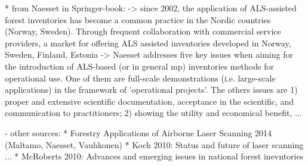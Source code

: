 			* from Naesset in Springer-book: 
			  -> since 2002, the application of ALS-assisted forest inventories has become a common practice in the Nordic countries (Norway, Sweden). Through frequent collaboration with commercial service 
			     providers, a market for offering ALS assisted inventories developed in Norway, Sweden, Finland, Estonia
			  -> Naesset addresses five key issues when aiming for the introduction of ALS-based (or in general mp) inventories methods for operational use. One of them are full-scale demonstrations 
			     (i.e. large-scale applications) in the framework of 'operational projects'. 
			     The others issues are 1) proper and extensive scientific documentation, acceptance in the scientific, and communication to practitioners; 2) showing the utility and economical benefit, ...


    -  other sources: 
        * Forestry Applications of Airborne Laser Scanning 2014 (Maltamo, Naesset, Vauhkonen)
        * Koch 2010: Status and future of laser scanning ...
        * McRoberts 2010: Advances and emerging issues in national forest inevntories
        
        
        
        
        
        
        
        
        
        
        
        
        
        
        
        